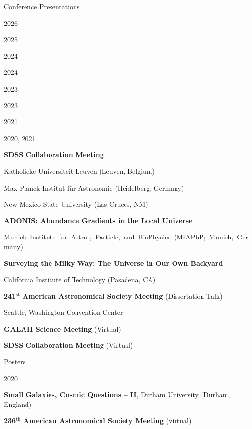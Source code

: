 \documentclass[cv.tex]{subfiles}
\begin{document}
\vspace{4mm}
\noindent
{\color{themecolor} \large Conference Presentations}
\par
\vspace{1mm}
\noindent
\parbox{0.18\textwidth}{%
	\vspace{1mm}
	\raggedleft
	\null \par
	2026 \par
	2025 \par
	2024 \par
	2024 \par
	\null \par
	2023 \par
	\null \par
	2023 \par
	\null \par
	2021 \par
	2020, 2021 \par
}
\hspace{1mm}
\parbox{0.8\textwidth}{%
	\textbf{SDSS Collaboration Meeting} \par
	Katholieke Universiteit Leuven (Leuven, Belgium) \par
	Max Planck Institut f{\"u}r Astronomie (Heidelberg, Germany) \par
	New Mexico State University (Las Cruces, NM) \par
	\textbf{ADONIS: Abundance Gradients in the Local Universe} \par
	\mbox{Munich Institute for Astro-, Particle, and BioPhysics (MIAPbP; %
	Munich, Germany)} \par
	\textbf{Surveying the Milky Way: The Universe in Our Own Backyard} \par
	California Institute of Technology (Pasadena, CA) \par
	\textbf{241$^\text{st}$ American Astronomical Society Meeting}
	(Dissertation Talk) \par
	Seattle, Washington Convention Center \par
	\textbf{GALAH Science Meeting} (Virtual) \par
	\textbf{SDSS Collaboration Meeting} (Virtual) \par
}

\vspace{4mm}
\noindent
{\color{themecolor} \large Posters}
\par
\vspace{1mm}
\noindent
\parbox{0.18\textwidth}{%
	 \par
	2020 \par
}
\hspace{1mm}
\parbox{0.8\textwidth}{%
	\textbf{Small Galaxies, Cosmic Questions -- II},
	Durham University (Durham, England) \par
	\textbf{236$^\text{th}$ American Astronomical Society Meeting} (virtual) \par
}
\end{document}
